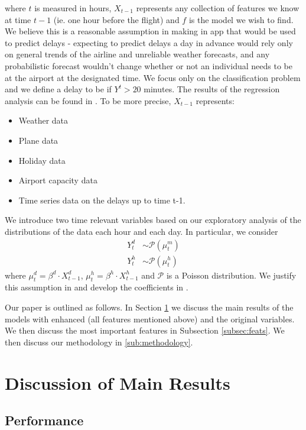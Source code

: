 \documentclass[twocolumn,showpacs,%
  nofootinbib,aps,superscriptaddress,%
  eqsecnum,prd,notitlepage,showkeys,10pt]{revtex4-1}
\begin{document}
where $t$ is measured in hours, $X_{t-1}$ represents any collection of features we know at time $t-1$ (ie. one hour before the flight) and $f$ is the model we wish to find. 
We believe this is a reasonable assumption in making
in app that would be used to predict delays - expecting to predict delays a day in advance would rely only on general trends of the airline and unreliable weather forecasts, and any probabilistic forecast wouldn't change whether or not an individual needs to be at the airport at the designated time. We focus only on the classification problem and we define a delay to be if $Y^t > 20$ minutes. The results of the regression analysis can be found in \cite{airline3}. To be more precise, $X_{t-1}$ represents:
\begin{itemize}
\item Weather data \cite{weather}
\item Plane data \cite{aviation}
\item Holiday data 
\item Airport capacity data \cite{boarding}
\item Time series data on the delays up to time t-1. \cite{airline2}
\end{itemize}
We introduce two time relevant variables based on our exploratory analysis of the distributions of the data each hour and each day. In particular, we consider 
\begin{align} Y_t^{d} &\sim \mathcal{P}(\mu_t^m)\\
Y_t^{h} &\sim \mathcal{P}(\mu_t^h)
\end{align}
where $\mu_t^d = \beta^d \cdot X_{t-1}^d$, $\mu_t^h= \beta^h \cdot X_{t-1}^h$ and $\mathcal{P}$ is a Poisson distribution. We justify this assumption in \cite{airline1} and develop the coefficients in \cite{airline2}.

Our paper is outlined as follows. In Section \ref{sec:main} we discuss the main results of the models with enhanced (all features mentioned above)  and the original variables. We then discuss
the most important features in Subsection \ref{subsec:feats}. We then discuss our methodology in \ref{sub:methodology}.

\section{Discussion of Main Results}
\label{sec:main}

\subsection{Performance}
\end{document}
